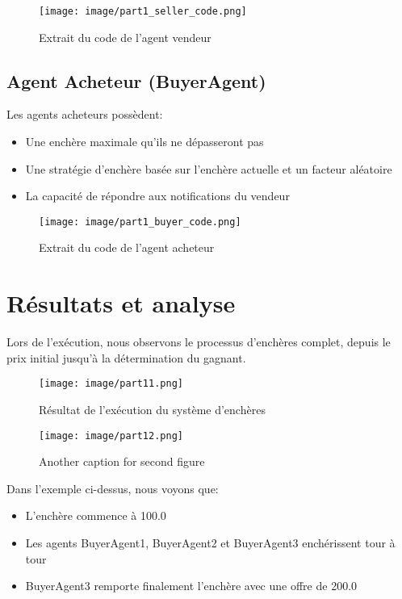 \documentclass[a4paper,12pt]{report}
\begin{document}
\begin{figure}[H]
    \centering
    \texttt{[image: image/part1\_seller\_code.png]}
    \caption{Extrait du code de l'agent vendeur}
\end{figure}

\subsection{Agent Acheteur (BuyerAgent)}
Les agents acheteurs possèdent:
\begin{itemize}
    \item Une enchère maximale qu'ils ne dépasseront pas
    \item Une stratégie d'enchère basée sur l'enchère actuelle et un facteur aléatoire
    \item La capacité de répondre aux notifications du vendeur
\end{itemize}

\begin{figure}[H]
    \centering
    \texttt{[image: image/part1\_buyer\_code.png]}
    \caption{Extrait du code de l'agent acheteur}
\end{figure}

\section{Résultats et analyse}
Lors de l'exécution, nous observons le processus d'enchères complet, depuis le prix initial jusqu'à la détermination du gagnant.

\begin{figure}[H]
    \centering
    \begin{minipage}{0.48\textwidth}
        \centering
        \texttt{[image: image/part11.png]}
        \caption{Résultat de l'exécution du système d'enchères}
        \label{fig:part1_execution}
    \end{minipage}
    \hfill
    \begin{minipage}{0.48\textwidth}
        \centering
        \texttt{[image: image/part12.png]}
        \caption{Another caption for second figure}
        \label{fig:second_figure}
    \end{minipage}
\end{figure}

Dans l'exemple ci-dessus, nous voyons que:
\begin{itemize}
    \item L'enchère commence à 100.0
    \item Les agents BuyerAgent1, BuyerAgent2 et BuyerAgent3 enchérissent tour à tour
    \item BuyerAgent3 remporte finalement l'enchère avec une offre de 200.0
\end{itemize}
\end{document}
